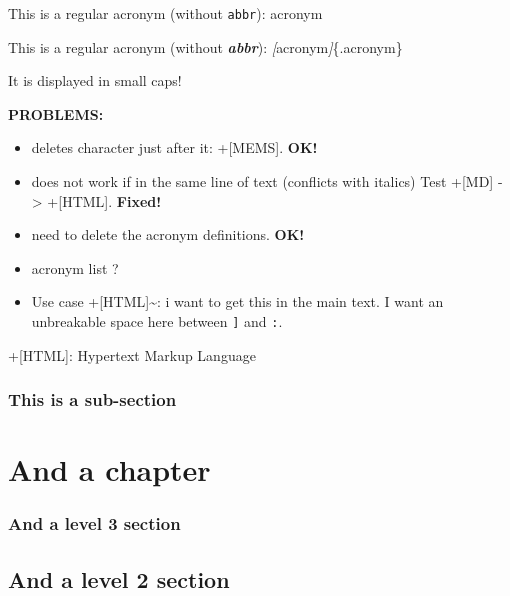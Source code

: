 \documentclass[
]{article}
\newenvironment{Shaded}{}{}
\newcommand{\CommentTok}[1]{\textcolor[rgb]{0.38,0.63,0.69}{\textit{#1}}}
\newcommand{\InformationTok}[1]{\textcolor[rgb]{0.38,0.63,0.69}{\textbf{\textit{#1}}}}
\newcommand{\NormalTok}[1]{#1}
\newcommand{\OtherTok}[1]{\textcolor[rgb]{0.00,0.44,0.13}{#1}}
\providecommand{\tightlist}{%
  \setlength{\itemsep}{0pt}\setlength{\parskip}{0pt}}
\begin{document}
This is a regular acronym (without \texttt{abbr}): {acronym}

\begin{Shaded}
\begin{Highlighting}[]
\NormalTok{This is a regular acronym (without }\InformationTok{\textasciigrave{}abbr\textasciigrave{}}\NormalTok{): }\CommentTok{[}\OtherTok{acronym}\CommentTok{]}\NormalTok{\{.acronym\}}
\end{Highlighting}
\end{Shaded}

It is displayed in small caps!

\textbf{PROBLEMS:}

\begin{itemize}
\tightlist
\item
  deletes character just after it: +{[}MEMS{]}. \textbf{OK!}
\item
  does not work if in the same line of text (conflicts with italics)
  Test +{[}MD{]} -\textgreater{} +{[}HTML{]}. \textbf{Fixed!}
\item
  need to delete the acronym definitions. \textbf{OK!}
\item
  acronym list ?
\item
  Use case +{[}HTML{]}\textasciitilde: i want to get this in the main
  text. I want an unbreakable space here between \texttt{{]}} and
  \texttt{:}.
\end{itemize}

+{[}HTML{]}: Hypertext Markup Language

\subsubsection{This is a sub-section}\label{this-is-a-sub-section}

\section{And a chapter}\label{and-a-chapter}

\subsubsection*{And a level 3 section}\label{and-a-level-3-section}

\subsection{And a level 2 section}\label{and-a-level-2-section}
\end{document}
